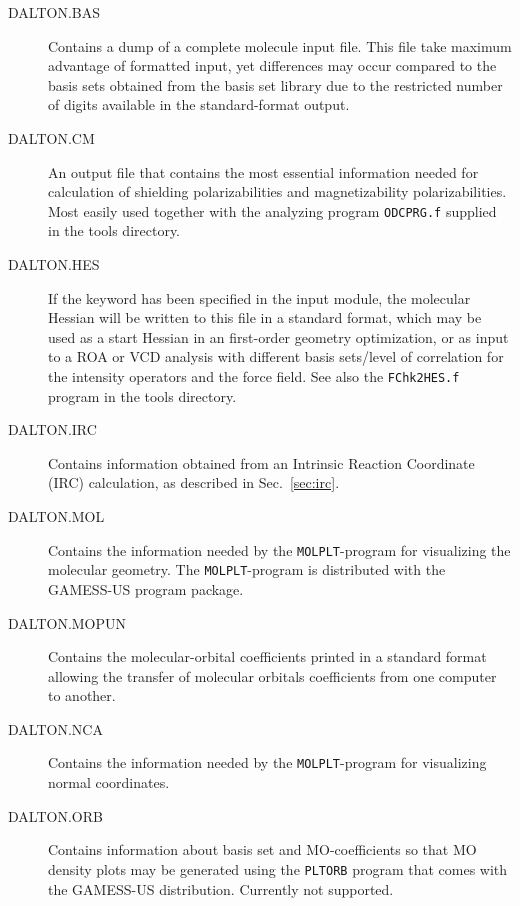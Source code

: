 \begin{description}
\item[DALTON.BAS] Contains a dump of a complete molecule input file.
 This file take maximum
advantage of formatted input, yet differences may occur compared to
the basis sets obtained from the basis set library due to the
restricted number of digits available in the standard-format output.

\item[DALTON.CM] An output file that contains the most essential
information needed for calculation of shielding polarizabilities
and magnetizability polarizabilities. Most easily used together
with the analyzing program \verb|ODCPRG.f| supplied in
the
tools directory.

\item[DALTON.HES] If the keyword  has been specified in
the  input module, the molecular Hessian
will be written
to this file in a standard format, which may be used as a start Hessian
in an first-order geometry
optimization, or as input to a ROA  or
VCD
analysis with different basis sets/level of correlation for the
intensity operators and the force field. See also the
\verb|FChk2HES.f| program in the tools directory.

\item[DALTON.IRC] Contains information obtained from an Intrinsic
Reaction Coordinate (IRC) calculation, as described in
Sec.~\ref{sec:irc}.

\item[DALTON.MOL] Contains the information needed by the
\verb|MOLPLT|-program for visualizing the molecular geometry. The
\verb|MOLPLT|-program is distributed with the GAMESS-US program
package.

\item[DALTON.MOPUN] Contains the molecular-orbital coefficients
printed in a standard format allowing the transfer of molecular
orbitals coefficients from one computer to another.

\item[DALTON.NCA] Contains the information needed by the
\verb|MOLPLT|-program for visualizing normal coordinates.

\item[DALTON.ORB] Contains information about basis set and
MO-coefficients so that MO density plots may be generated using the
\verb|PLTORB| program that comes with the GAMESS-US
distribution. Currently not supported.


\end{description}
